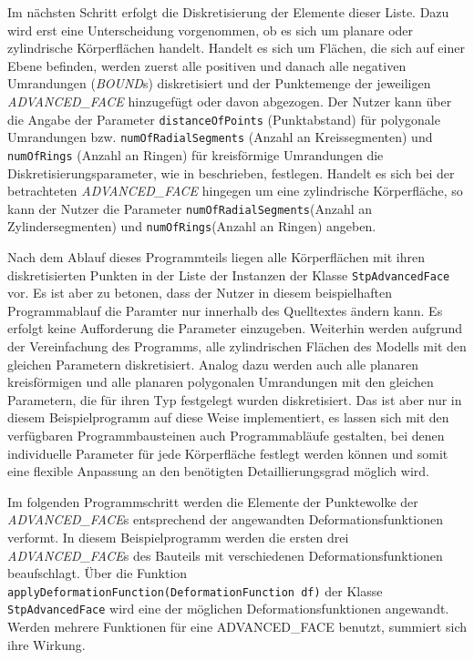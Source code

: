 Im nächsten Schritt erfolgt die Diskretisierung der Elemente dieser Liste. 
Dazu wird erst eine Unterscheidung vorgenommen, ob es sich um planare oder zylindrische Körperflächen handelt. 
Handelt es sich um Flächen, die sich auf einer Ebene befinden, werden zuerst alle positiven und danach alle negativen Umrandungen (\textit{BOUND}s) diskretisiert und der Punktemenge der jeweiligen \textit{ADVANCED\_FACE} hinzugefügt oder davon abgezogen. Der Nutzer kann über die Angabe der Parameter \verb|distanceOfPoints| (Punktabstand) für polygonale Umrandungen bzw. \verb|numOfRadialSegments| (Anzahl an Kreissegmenten) und \verb|numOfRings| (Anzahl an Ringen) für kreisförmige Umrandungen die Diskretisierungsparameter, wie in  beschrieben, festlegen.
Handelt es sich bei der betrachteten \textit{ADVANCED\_FACE} hingegen um eine zylindrische Körperfläche, so kann der Nutzer die Parameter \verb|numOfRadialSegments|(Anzahl an Zylindersegmenten) und \verb|numOfRings|(Anzahl an Ringen) angeben. 

Nach dem Ablauf dieses Programmteils liegen alle Körperflächen mit ihren diskretisierten Punkten in der Liste der Instanzen der Klasse \verb|StpAdvancedFace| vor. 
Es ist aber zu betonen, dass der Nutzer in diesem beispielhaften Programmablauf die Paramter nur innerhalb des Quelltextes ändern kann. Es erfolgt keine Aufforderung die Parameter einzugeben.
Weiterhin werden aufgrund der Vereinfachung des Programms, alle zylindrischen Flächen des Modells mit den gleichen Parametern diskretisiert. Analog dazu werden auch alle planaren kreisförmigen und alle planaren polygonalen Umrandungen mit den gleichen Parametern, die für ihren Typ festgelegt wurden diskretisiert. Das ist aber nur in diesem Beispielprogramm  auf diese Weise implementiert, es lassen sich mit den verfügbaren Programmbausteinen auch Programmabläufe gestalten, bei denen individuelle Parameter für jede Körperfläche festlegt werden können und somit eine flexible Anpassung an den benötigten Detaillierungsgrad möglich wird.          

Im folgenden Programmschritt werden die Elemente der Punktewolke der \textit{ADVANCED\_FACE}s entsprechend der angewandten Deformationsfunktionen verformt. In diesem Beispielprogramm werden die ersten drei \textit{ADVANCED\_FACE}s des Bauteils mit verschiedenen Deformationsfunktionen beaufschlagt. Über die Funktion \verb|applyDeformationFunction(DeformationFunction df)| der Klasse \verb|StpAdvancedFace| wird eine der möglichen Deformationsfunktionen angewandt.
Werden mehrere Funktionen für eine ADVANCED\_FACE benutzt, summiert sich ihre Wirkung. 

